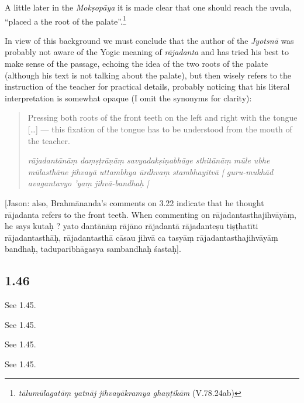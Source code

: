 \begin{ekdosis}
\begin{philcomm}[hp01_045]
A little later in the \emph{Mokṣopāya} it is made clear that one should reach the uvula, ``placed a
the root of the palate''.\footnote{\emph{tālumūlagatāṃ yatnāj jihvayākramya ghaṇṭikām}
(V.78.24ab)}

In view of this background we must conclude that the author of the \emph{Jyotsnā} was probably not
aware of the Yogic meaning of \emph{rājadanta} and has tried his best to make sense of the passage,
echoing the idea of the two roots of the palate (although his text is not talking about the
palate), but then wisely refers to the instruction of the teacher for practical details, probably
noticing that his literal interpretation is somewhat opaque (I omit the synonyms for clarity):

\begin{quote}
Pressing both roots of the front teeth on the left and right with the tongue [\ldots] — this fixation of the tongue has to be understood from the mouth of the teacher.

\emph{rājadantānāṃ daṃṣṭrāṇāṃ savyadakṣiṇabhāge sthitānāṃ mūle ubhe mūlasthāne jihvayā uttambhya ūrdhvaṃ stambhayitvā | guru-mukhād avagantavyo 'yaṃ jihvā-bandhaḥ |}
\end{quote}

[Jason: also, Brahmānanda’s comments on 3.22 indicate that he thought rājadanta refers to the front teeth. When commenting on rājadantasthajihvāyāṃ, he says kutaḥ ? yato dantānāṃ rājāno rājadantā rājadanteṣu tiṣṭhatīti rājadantasthāḥ, rājadantasthā cāsau jihvā ca tasyāṃ rājadantasthajihvāyāṃ bandhaḥ, taduparibhāgasya sambandhaḥ śastaḥ].
\end{philcomm}

\subsection*{1.46}
\begin{translation}[hp01_046]
See 1.45.
\end{translation}

\begin{sources}[hp01_046]
See 1.45.
\end{sources}

\begin{testimonia}[hp01_046]
See 1.45.
\end{testimonia}

\begin{philcomm}[hp01_046]
See 1.45.
\end{philcomm}


\end{ekdosis}
